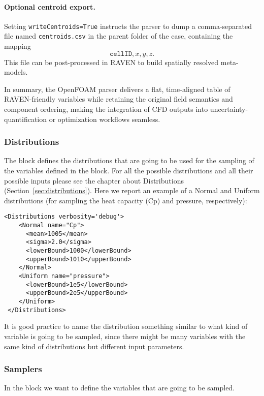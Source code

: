 \paragraph{Optional centroid export.}
Setting \texttt{writeCentroids=True} instructs the parser to dump a
comma-separated file named \texttt{centroids.csv} in the parent folder of the
case, containing the mapping
\[
\texttt{cellID},x,y,z .
\]
This file can be post-processed in RAVEN to build spatially resolved meta-models.

\bigskip
In summary, the OpenFOAM parser delivers a flat, time-aligned table of
RAVEN-friendly variables while retaining the original field semantics and
component ordering, making the integration of CFD outputs into
uncertainty-quantification or optimization workflows seamless.

\subsubsection{Distributions}
The  block defines the distributions that are going
to be used for the sampling of the variables defined in the  block.
%
For all the possible distributions and all their possible inputs please see the
chapter about Distributions (Section~\ref{sec:distributions}).
%
Here we report an example of a Normal and Uniform distributions (for sampling the heat capacity (Cp) and pressure, respectively):

\begin{lstlisting}[style=XML,morekeywords={name,debug}]
<Distributions verbosity='debug'>
    <Normal name="Cp">
      <mean>1005</mean>
      <sigma>2.0</sigma>
      <lowerBound>1000</lowerBound>
      <upperBound>1010</upperBound>
    </Normal>
    <Uniform name="pressure">
      <lowerBound>1e5</lowerBound>
      <upperBound>2e5</upperBound>
    </Uniform>
 </Distributions>
\end{lstlisting}

\noindent
It is good practice to name the distribution something similar to what kind of
variable is going to be sampled, since there might be many variables with the
same kind of distributions but different input parameters.

\subsubsection{Samplers}
In the  block we want to define the variables that are going to be sampled.

